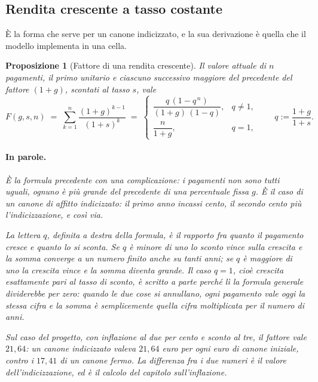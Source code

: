 \documentclass[11pt,a4paper]{article}
\theoremstyle{definition}
\theoremstyle{plain}
\newtheorem{proposizione}[definizione]{Proposizione}
\begin{document}
\subsection{Rendita crescente a tasso costante}

È la forma che serve per un canone indicizzato, e la sua derivazione è quella che il modello implementa in una cella.

\begin{proposizione}[Fattore di una rendita crescente]
Il valore attuale di $n$ pagamenti, il primo unitario e ciascuno successivo maggiore del precedente del fattore $(1+g)$, scontati al tasso $s$, vale
\begin{equation}
F(g,s,n) \;=\; \sum_{k=1}^{n} \frac{(1+g)^{k-1}}{(1+s)^k}
\;=\;
\begin{cases}
\dfrac{q\,(1-q^{\,n})}{(1+g)\,(1-q)}, & q \neq 1,\\[1.2em]
\dfrac{n}{1+g}, & q = 1,
\end{cases}
\qquad q := \frac{1+g}{1+s}.
\label{eq:crescente}
\end{equation}

\paragraph{In parole.} È la formula precedente con una complicazione: i pagamenti non sono tutti uguali, ognuno è più grande del precedente di una percentuale fissa $g$. È il caso di un canone di affitto indicizzato: il primo anno incassi cento, il secondo cento più l'indicizzazione, e così via.

La lettera $q$, definita a destra della formula, è il rapporto fra quanto il pagamento cresce e quanto lo si sconta. Se $q$ è minore di uno lo sconto vince sulla crescita e la somma converge a un numero finito anche su tanti anni; se $q$ è maggiore di uno la crescita vince e la somma diventa grande. Il caso $q = 1$, cioè crescita esattamente pari al tasso di sconto, è scritto a parte perché lì la formula generale dividerebbe per zero: quando le due cose si annullano, ogni pagamento vale oggi la stessa cifra e la somma è semplicemente quella cifra moltiplicata per il numero di anni.

Sul caso del progetto, con inflazione al due per cento e sconto al tre, il fattore vale $21{,}64$: un canone indicizzato valeva $21{,}64$ euro per ogni euro di canone iniziale, contro i $17{,}41$ di un canone fermo. La differenza fra i due numeri è il valore dell'indicizzazione, ed è il calcolo del capitolo sull'inflazione.
\end{proposizione}
\end{document}
